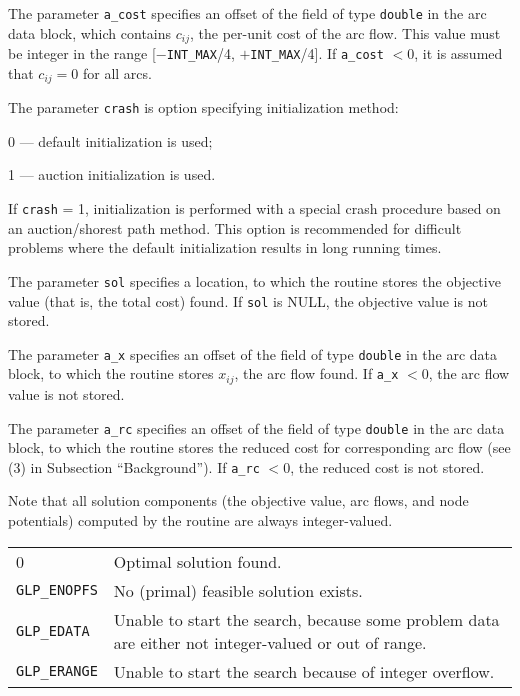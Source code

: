 \documentclass[11pt]{report}
\makeatletter
\def\para#1{\noindent{\bf#1}}
\def\returns{\para{Returns}}
\newenvironment{retlist}
{  \def\arraystretch{1.5}
   \noindent
   \begin{tabular}{@{}p{1in}@{}p{5.5in}@{}}
}
{\end{tabular}}
\makeatother
\begin{document}
The parameter \verb|a_cost| specifies an offset of the field of type
\verb|double| in the arc data block, which contains $c_{ij}$, the
per-unit cost of the arc flow. This value must be integer in the range
[$-$\verb|INT_MAX|/4, $+$\verb|INT_MAX|/4]. If \verb|a_cost| $<0$, it
is assumed that $c_{ij}=0$ for all arcs.

The parameter \verb|crash| is option specifying initialization method:

0 --- default initialization is used;

1 --- auction initialization is used.

\noindent
If \verb|crash| = 1, initialization is performed with a special crash
procedure based on an auction/shorest path method. This option is
recommended for difficult problems where the default initialization
results in long running times.

The parameter \verb|sol| specifies a location, to which the routine
stores the objective value (that is, the total cost) found. If
\verb|sol| is NULL, the objective value is not stored.

\newpage

The parameter \verb|a_x| specifies an offset of the field of type
\verb|double| in the arc data block, to which the routine stores
$x_{ij}$, the arc flow found. If \verb|a_x| $<0$, the arc flow value is
not stored.

The parameter \verb|a_rc| specifies an offset of the field of type
\verb|double| in the arc data block, to which the routine stores
the reduced cost for corresponding arc flow (see (3) in Subsection
``Background''). If \verb|a_rc| $<0$, the reduced cost is not stored.

Note that all solution components (the objective value, arc flows, and
node potentials) computed by the routine are always integer-valued.

\returns

\begin{retlist}
0 & Optimal solution found.\\

\verb|GLP_ENOPFS| & No (primal) feasible solution exists.\\

\verb|GLP_EDATA| & Unable to start the search, because some problem
data are either not integer-valued or out of range.\\

\verb|GLP_ERANGE| & Unable to start the search because of integer
overflow.\\
\end{retlist}
\end{document}
